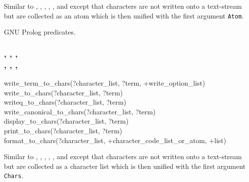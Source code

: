 \Description

\texttt{}%
\texttt{}%
\texttt{}%
\texttt{}%
\texttt{}%
\texttt{}%
\texttt{}%
Similar to , , ,
, , 
 and   except that
characters are not written onto a text-stream but are collected as an atom
which is then unified with the first argument \texttt{Atom}.

\begin{PlErrors}



\end{PlErrors}

\Portability

GNU Prolog predicates.

\subsubsection{,
               ,
               , \\
               ,
               ,
               , \\
               }

\begin{TemplatesOneCol}
write\_term\_to\_chars(?character\_list, ?term, +write\_option\_list)\\
write\_to\_chars(?character\_list, ?term)\\
writeq\_to\_chars(?character\_list, ?term)\\
write\_canonical\_to\_chars(?character\_list, ?term)\\
display\_to\_chars(?character\_list, ?term)\\
print\_to\_chars(?character\_list, ?term)\\
format\_to\_chars(?character\_list, +character\_code\_list\_or\_atom, +list)

\end{TemplatesOneCol}

\Description

\texttt{}%
\texttt{}%
\texttt{}%
\texttt{}%
\texttt{}%
\texttt{}%
\texttt{}%
Similar to , , ,
, , 
 and   except that
characters are not written onto a text-stream but are collected as a
character list which is then unified with the first argument \texttt{Chars}.

